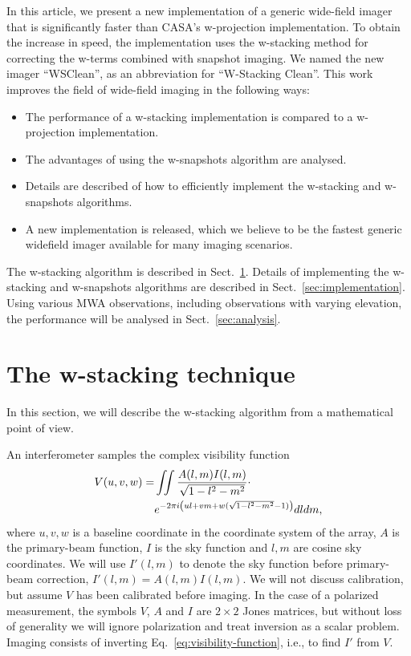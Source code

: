 \documentclass[useAMS,usenatbib]{mn2e}
\begin{document}
In this article, we present a new implementation of a generic wide-field imager that is significantly faster than CASA's w-projection implementation. To obtain the increase in speed, the implementation uses the w-stacking method for correcting the w-terms combined with snapshot imaging. We named the new imager ``WSClean'', as an abbreviation for ``W-Stacking Clean''. This work improves the field of wide-field imaging in the following ways:
\begin{itemize}
 \item The performance of a w-stacking implementation is compared to a w-projection implementation.
 \item The advantages of using the w-snapshots algorithm are analysed.
 \item Details are described of how to efficiently implement the w-stacking and w-snapshots algorithms.
 \item A new implementation is released, which we believe to be the fastest generic widefield imager available for many imaging scenarios.
\end{itemize}

The w-stacking algorithm is described in Sect.~\ref{sec:wstacking}. Details of implementing the w-stacking and w-snapshots algorithms are described in Sect.~\ref{sec:implementation}. Using various MWA observations, including observations with varying elevation, the performance will be analysed in Sect.~\ref{sec:analysis}.

\section{The w-stacking technique} \label{sec:wstacking}
In this section, we will describe the w-stacking algorithm from a mathematical point of view.

An interferometer samples the complex visibility function
\begin{align}\notag
V(u,v,w) = & \iint \frac{A(l,m) I(l,m)}{\sqrt{1-l^2-m^2}} \cdot \\ \label{eq:visibility-function}
& e^{-2\pi i \left(ul + vm + w(\sqrt{1-l^2-m^2}-1)\right)} dl dm,
\end{align}
where $u,v,w$ is a baseline coordinate in the coordinate system of the array, $A$ is the primary-beam function, $I$ is the sky function and $l,m$ are cosine sky coordinates. We will use $I'(l,m)$ to denote the sky function before primary-beam correction, $I'(l,m)=A(l,m)I(l,m)$. We will not discuss calibration, but assume $V$ has been calibrated before imaging. In the case of a polarized measurement, the symbols $V$, $A$ and $I$ are $2\times 2$ Jones matrices, but without loss of generality we will ignore polarization and treat inversion as a scalar problem. Imaging consists of inverting Eq.~\eqref{eq:visibility-function}, i.e., to find $I'$ from $V$.
\end{document}
